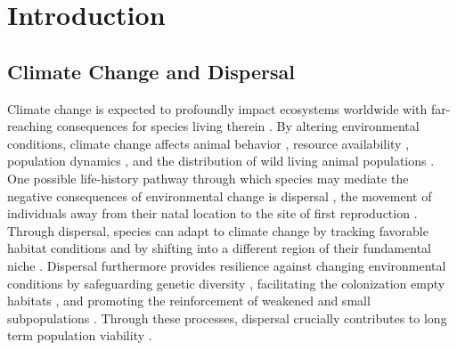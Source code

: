 \documentclass[abstract=on,10pt,a4paper,bibliography=totocnumbered]{article}
\begin{document}
\onehalfspacing
\tableofcontents
\doublespacing

\newpage
{}


\section{Introduction}
\subsection{Climate Change and Dispersal}
Climate change is expected to profoundly impact ecosystems worldwide with
far-reaching consequences for species living therein \citep{Ozgul.2010,
Radchuk.2019, IPCC.2022}. By altering environmental conditions, climate change
affects animal behavior \citep{Fuller.2016}, resource availability
\citep{Durant.2007}, population dynamics \citep{Paniw.2021}, and the
distribution of wild living animal populations \citep{Thomas.2004,
Thuiller.2006}. One possible life-history pathway through which species may
mediate the negative consequences of environmental change is dispersal
\citep{Anderson.2012}, the movement of individuals away from their natal
location to the site of first reproduction \citep{Clobert.2012}. Through
dispersal, species can adapt to climate change by tracking favorable habitat
conditions \citep{Raia.2012} and by shifting into a different region of their
fundamental niche \citep{Kokko.2006}. Dispersal furthermore provides resilience
against changing environmental conditions by safeguarding genetic diversity
\citep{Frankham.2002, Leigh.2012, Baguette.2013}, facilitating the colonization
empty habitats \citep{Gustafson.1996, Hanski.1999a, MacArthur.2001}, and
promoting the reinforcement of weakened and small subpopulations
\citep{Brown.1977}. Through these processes, dispersal crucially contributes to
long term population viability \citep{Kokko.2006, Fahrig.2003}.
\end{document}
